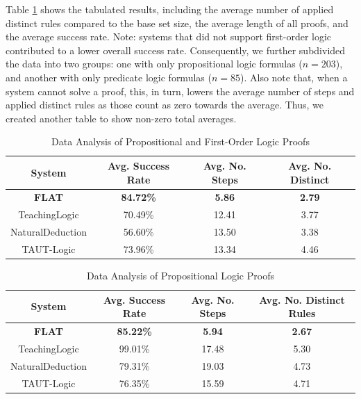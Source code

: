 \documentclass[ms]{uncgdissertationexp2}
\theoremstyle{plain}
\theoremstyle{definition}
\theoremstyle{remark}
\begin{document}
Table \ref{table:allData} shows the tabulated results, including the average number of applied distinct rules compared to the base set size, the average length of all proofs, and the average success rate. Note: systems that did not support first-order logic contributed to a lower overall success rate. Consequently, we further subdivided the data into two groups: one with only propositional logic formulas ($n=203$), and another with only predicate logic formulas ($n=85$). Also note that, when a system cannot solve a proof, this, in turn, lowers the average number of steps and applied distinct rules as those count as zero towards the average. Thus, we created another table to show non-zero total averages.
\begin{table}[h!]
	\centering
	\caption{Data Analysis of Propositional and First-Order Logic Proofs}
	\begin{tabular}{*4c}
		\toprule
		System           & Avg. Success Rate & Avg. No. Steps & Avg. No. Distinct \\    
		\midrule
		\textbf{FLAT}    & \textbf{84.72\%}  & \textbf{5.86}  & \textbf{2.79}     \\
		TeachingLogic    & 70.49\%           & 12.41          & 3.77              \\
		NaturalDeduction & 56.60\%           & 13.50          & 3.38              \\
		TAUT-Logic       & 73.96\%           & 13.34          & 4.46              \\
		\bottomrule
	\end{tabular}
	\label{table:allData}
\end{table}

\begin{table}[h!]
	\centering
	\caption{Data Analysis of Propositional Logic Proofs}
	\begin{tabular}{*4c}
		\toprule
		System           & Avg. Success Rate & Avg. No. Steps & Avg. No. Distinct Rules \\    
		\midrule
		\textbf{FLAT}    & \textbf{85.22\%}  & \textbf{5.94}  & \textbf{2.67}           \\
		TeachingLogic    & 99.01\%           & 17.48          & 5.30                    \\
		NaturalDeduction & 79.31\%           & 19.03          & 4.73                    \\
		TAUT-Logic       & 76.35\%           & 15.59          & 4.71                    \\
		\bottomrule
	\end{tabular}
	\label{table:propData}
\end{table}
\end{document}
